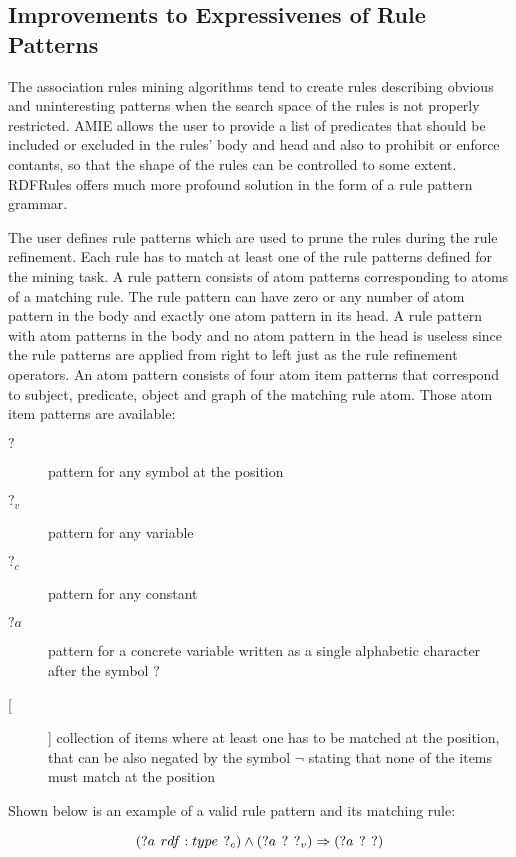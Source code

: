 \subsection{Improvements to Expressivenes of Rule Patterns\label{patterns}}

The association rules mining algorithms tend to create rules describing obvious and uninteresting patterns when the search space of the rules is not properly restricted. AMIE allows the user to provide a list of predicates that should be included or excluded in the rules' body and head and also to prohibit or enforce contants, so that the shape of the rules can be controlled to some extent. RDFRules offers much more profound solution in the form of a rule pattern grammar. 

The user defines rule patterns which are used to prune the rules during the rule refinement. Each rule has to match at least one of the rule patterns defined for the mining task. A rule pattern consists of atom patterns corresponding to atoms of a matching rule. The rule pattern can have zero or any number of atom pattern in the body and exactly one atom pattern in its head. A rule pattern with atom patterns in the body and no atom pattern in the head is useless since the rule patterns are applied from right to left just as the rule refinement operators. An atom pattern consists of four atom item patterns that correspond to subject, predicate, object and graph of the matching rule atom. Those atom item patterns are available:

\begin{description}
\item[$?$] pattern for any symbol at the position
\item[$?_{v}$] pattern for any variable
\item[$?_{c}$] pattern for any constant
\item[$?a$] pattern for a concrete variable written as a single alphabetic character after the symbol $?$ 
\item[[]] collection of items where at least one has to be matched at the position, that can be also negated by the symbol $\neg$ stating that none of the items must match at the position
\end{description}

Shown below is an example of a valid rule pattern and its matching rule:

$$(?a\hspace{0.4em} rdf:type \hspace{0.4em}?_{c}) \land (?a\hspace{0.4em} ? \hspace{0.4em}?_{v}) \Rightarrow (?a\hspace{0.4em}? \hspace{0.4em}?)$$

